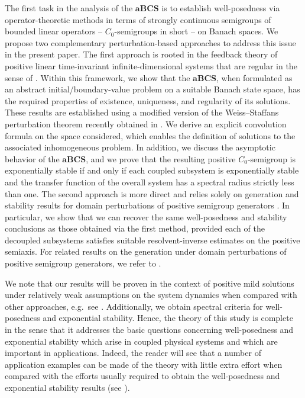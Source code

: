 \documentclass[a4paper,11pt,reqno]{amsart}
\theoremstyle{plain}
\numberwithin{equation}{section}
\begin{document}
The first task in the analysis of the $\mathbf{aBCS}$ is to establish well-posedness via operator-theoretic methods in terms of strongly continuous semigroups of bounded linear operators -- $C_0$-semigroups in short -- on Banach spaces. We propose two complementary perturbation-based approaches to address this issue in the present paper. The first approach is rooted in the feedback theory of positive linear time-invariant infinite-dimensional systems that are regular in the sense of \cite{MR2154892,MR1359020}. Within this framework, we show that the $\mathbf{aBCS}$, when formulated as an abstract initial/boundary-value problem on a suitable Banach state space, has the required properties of existence, uniqueness, and regularity of its solutions. These results are established using a modified version of the Weiss–Staffans perturbation theorem recently obtained in \cite{GANTOUH2026106307}. We derive an explicit convolution formula on the space considered, which enables the definition of solutions to the associated inhomogeneous problem. In addition, we discuss the asymptotic behavior of the $\mathbf{aBCS}$, and we prove that the resulting positive $C_0$-semigroup is exponentially stable if and only if each coupled subsystem is exponentially stable and the transfer function of the overall system has a spectral radius strictly less than one. The second approach is more direct and relies solely on generation and stability results for domain perturbations of positive semigroup generators \cite{MR4711370}. In particular, we show that we can recover the same well-posedness and stability conclusions as those obtained via the first method, provided each of the decoupled subsystems satisfies suitable resolvent-inverse estimates on the positive semiaxis. For related results on the generation under domain perturbations of positive semigroup generators, we refer to \cite{Barbieri,Alessio2026,MR4386712,MR4711370,GANTOUH2026106307,Gantouh2026,PiMa,MR4635044}.

We note that our results will be proven in the context of positive mild solutions under relatively weak assumptions on the system dynamics when compared with other approaches, e.g.\ see \cite{MR3343578,GANTOUH2026106307,MR4466961}. Additionally, we obtain spectral criteria for well-posedness and exponential stability. Hence, the theory of this study is complete in the sense that it addresses the basic questions concerning well-posedness and exponential stability which arise in coupled physical systems and which are important in applications. Indeed, the reader will see that a number of application examples can be made of the theory with little extra effort when compared with the efforts usually required to obtain the well-posedness and exponential stability results (see \cite{MR3624395,Boujijane2024,GANTOUH2026106307,MR3343578,MR4466961}).
\end{document}

